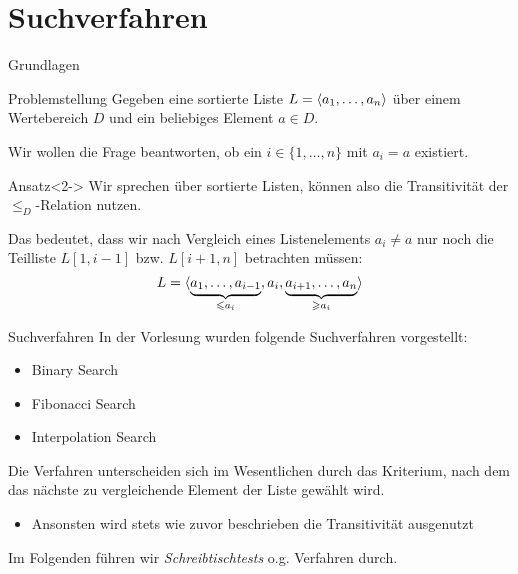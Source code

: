 \section{Suchverfahren}

\begin{frame}{Grundlagen}
\begin{block}{Problemstellung}
Gegeben eine \alert{sortierte} Liste $L = \langle a_1, \dots, a_n\rangle$ \"uber einem Wertebereich $D$ und ein beliebiges Element $a \in D$.

Wir wollen die Frage beantworten, ob ein $i \in \{ 1, \dots, n \}$ mit $a_i = a$ existiert.
\end{block}
\begin{block}{Ansatz}<2->
Wir sprechen \"uber \alert{sortierte} Listen, k\"onnen also die \alert{Transitivit\"at} der $\leq_D$-Relation nutzen.

Das bedeutet, dass wir nach Vergleich eines Listenelements $a_i \neq a$ nur noch die Teilliste $L[1, i-1]$ bzw. $L[i+1, n]$ betrachten m\"ussen:
$$L = \langle\underbrace{a_1, \dots, a_{i-1}}_{\leqslant a_i}, a_i, \underbrace{a_{i+1}, \dots, a_n}_{\geqslant a_i}\rangle$$
\end{block}
\end{frame}

\begin{frame}{Suchverfahren}
In der Vorlesung wurden folgende Suchverfahren vorgestellt:
\begin{itemize}
    \item Binary Search
    \item Fibonacci Search
    \item Interpolation Search
\end{itemize}
Die Verfahren unterscheiden sich im Wesentlichen durch das \alert{Kriterium}, nach dem das n\"achste zu vergleichende Element der Liste gew\"ahlt wird.
\begin{itemize}
    \item Ansonsten wird stets wie zuvor beschrieben die Transitivit\"at ausgenutzt
\end{itemize}

Im Folgenden führen wir \emph{Schreibtischtests} o.g. Verfahren durch.
\end{frame}

